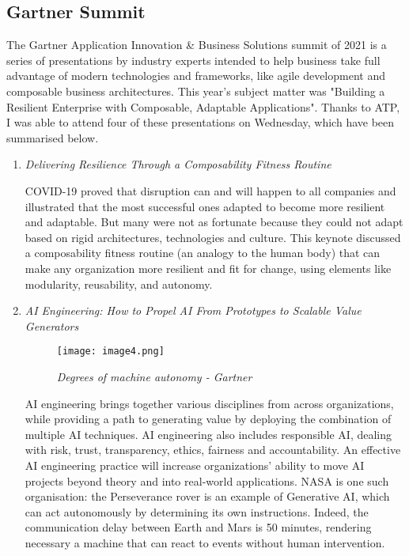 
\subsection{Gartner Summit}

The Gartner Application Innovation \& Business Solutions summit of 2021 is a
series of presentations by industry experts intended to help business take full
advantage of modern technologies and frameworks, like agile development and
composable business architectures. This year's subject matter was "Building a
Resilient Enterprise with Composable, Adaptable Applications". Thanks to ATP, I
was able to attend four of these presentations on Wednesday, which have been
summarised below.

\begin{enumerate}
    \item \color{dgreen} \textit{Delivering Resilience Through a Composability
          Fitness Routine}

    \color{black}COVID-19 proved that disruption can and will happen to all
    companies and illustrated that the most successful ones adapted to become
    more resilient and adaptable. But many were not as fortunate because they
    could not adapt based on rigid architectures, technologies and culture. This
    keynote discussed a composability fitness routine (an analogy to the human
    body) that can make any organization more resilient and fit for change,
    using elements like modularity, reusability, and autonomy.

    \item \color{dgreen} \textit{AI Engineering: How to Propel AI From
          Prototypes to Scalable Value Generators}

    \begin{figure}[H]
        \centering
            \texttt{[image: image4.png]}
            \caption*{\textit{Degrees of machine autonomy - Gartner}}
    \end{figure}

    \color{black} AI engineering brings together various disciplines from across
    organizations, while providing a path to generating value by deploying the
    combination of multiple AI techniques. AI engineering also includes
    responsible AI, dealing with risk, trust, transparency, ethics, fairness and
    accountability. An effective AI engineering practice will increase
    organizations’ ability to move AI projects beyond theory and into real-world
    applications. NASA is one such organisation: the Perseverance rover is an
    example of Generative AI, which can act  autonomously by determining its own
    instructions. Indeed, the communication delay between Earth and Mars is 50
    minutes, rendering necessary a machine that can react to events without
    human intervention.


\end{enumerate}
